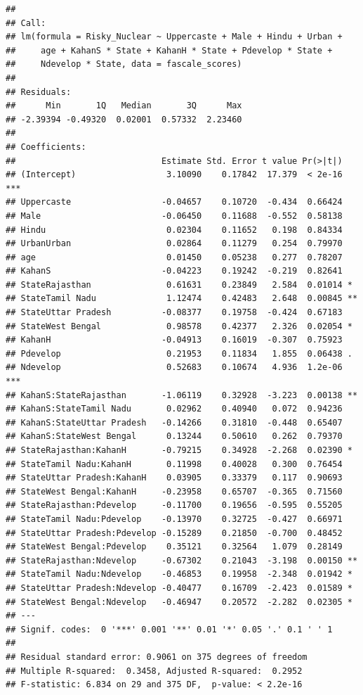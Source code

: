 \documentclass[
]{article}
\begin{document}
\begin{verbatim}
## 
## Call:
## lm(formula = Risky_Nuclear ~ Uppercaste + Male + Hindu + Urban + 
##     age + KahanS * State + KahanH * State + Pdevelop * State + 
##     Ndevelop * State, data = fascale_scores)
## 
## Residuals:
##      Min       1Q   Median       3Q      Max 
## -2.39394 -0.49320  0.02001  0.57332  2.23460 
## 
## Coefficients:
##                             Estimate Std. Error t value Pr(>|t|)    
## (Intercept)                  3.10090    0.17842  17.379  < 2e-16 ***
## Uppercaste                  -0.04657    0.10720  -0.434  0.66424    
## Male                        -0.06450    0.11688  -0.552  0.58138    
## Hindu                        0.02304    0.11652   0.198  0.84334    
## UrbanUrban                   0.02864    0.11279   0.254  0.79970    
## age                          0.01450    0.05238   0.277  0.78207    
## KahanS                      -0.04223    0.19242  -0.219  0.82641    
## StateRajasthan               0.61631    0.23849   2.584  0.01014 *  
## StateTamil Nadu              1.12474    0.42483   2.648  0.00845 ** 
## StateUttar Pradesh          -0.08377    0.19758  -0.424  0.67183    
## StateWest Bengal             0.98578    0.42377   2.326  0.02054 *  
## KahanH                      -0.04913    0.16019  -0.307  0.75923    
## Pdevelop                     0.21953    0.11834   1.855  0.06438 .  
## Ndevelop                     0.52683    0.10674   4.936  1.2e-06 ***
## KahanS:StateRajasthan       -1.06119    0.32928  -3.223  0.00138 ** 
## KahanS:StateTamil Nadu       0.02962    0.40940   0.072  0.94236    
## KahanS:StateUttar Pradesh   -0.14266    0.31810  -0.448  0.65407    
## KahanS:StateWest Bengal      0.13244    0.50610   0.262  0.79370    
## StateRajasthan:KahanH       -0.79215    0.34928  -2.268  0.02390 *  
## StateTamil Nadu:KahanH       0.11998    0.40028   0.300  0.76454    
## StateUttar Pradesh:KahanH    0.03905    0.33379   0.117  0.90693    
## StateWest Bengal:KahanH     -0.23958    0.65707  -0.365  0.71560    
## StateRajasthan:Pdevelop     -0.11700    0.19656  -0.595  0.55205    
## StateTamil Nadu:Pdevelop    -0.13970    0.32725  -0.427  0.66971    
## StateUttar Pradesh:Pdevelop -0.15289    0.21850  -0.700  0.48452    
## StateWest Bengal:Pdevelop    0.35121    0.32564   1.079  0.28149    
## StateRajasthan:Ndevelop     -0.67302    0.21043  -3.198  0.00150 ** 
## StateTamil Nadu:Ndevelop    -0.46853    0.19958  -2.348  0.01942 *  
## StateUttar Pradesh:Ndevelop -0.40477    0.16709  -2.423  0.01589 *  
## StateWest Bengal:Ndevelop   -0.46947    0.20572  -2.282  0.02305 *  
## ---
## Signif. codes:  0 '***' 0.001 '**' 0.01 '*' 0.05 '.' 0.1 ' ' 1
## 
## Residual standard error: 0.9061 on 375 degrees of freedom
## Multiple R-squared:  0.3458, Adjusted R-squared:  0.2952 
## F-statistic: 6.834 on 29 and 375 DF,  p-value: < 2.2e-16
\end{verbatim}
\end{document}
